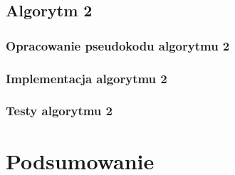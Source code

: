 \documentclass[a4paper]{article}
\begin{document}
\subsection{Algorytm 2}
\subsubsection{Opracowanie pseudokodu algorytmu 2}
\subsubsection{Implementacja algorytmu 2}
\subsubsection{Testy algorytmu 2}


\section{Podsumowanie}


\newpage
\printbibliography[heading=bibintoc]
\end{document}
